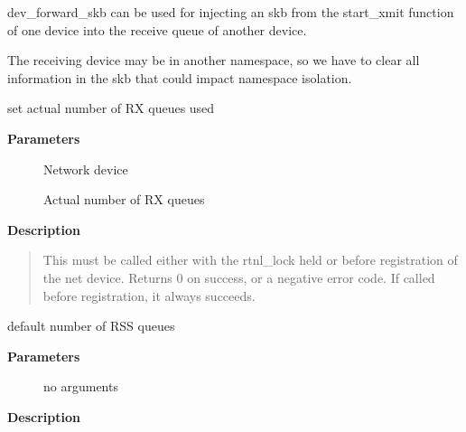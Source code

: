 \documentclass[a4paper,8pt,english]{sphinxmanual}
\begin{document}
dev\_forward\_skb can be used for injecting an skb from the
start\_xmit function of one device into the receive queue
of another device.

The receiving device may be in another namespace, so
we have to clear all information in the skb that could
impact namespace isolation.

\begin{fulllineitems}
\label{networking/kapi:c.netif_set_real_num_rx_queues}
set actual number of RX queues used

\end{fulllineitems}


\textbf{Parameters}
\begin{description}
\item[{}] \leavevmode
Network device

\item[{}] \leavevmode
Actual number of RX queues

\end{description}

\textbf{Description}
\begin{quote}

This must be called either with the rtnl\_lock held or before
registration of the net device.  Returns 0 on success, or a
negative error code.  If called before registration, it always
succeeds.
\end{quote}

\begin{fulllineitems}
\label{networking/kapi:c.netif_get_num_default_rss_queues}
default number of RSS queues

\end{fulllineitems}


\textbf{Parameters}
\begin{description}
\item[{}] \leavevmode
no arguments

\end{description}

\textbf{Description}
\end{document}
